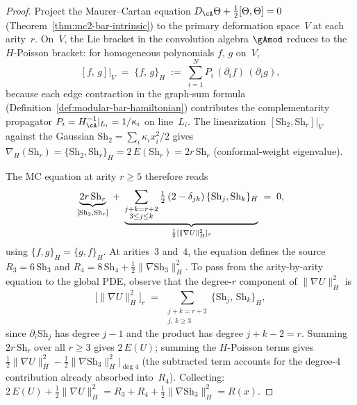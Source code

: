 \begin{proof}
Project the Maurer--Cartan equation
$D_\cA \Theta + \frac{1}{2}[\Theta, \Theta] = 0$
\textup{(}Theorem~\textup{\ref{thm:mc2-bar-intrinsic}})
to the primary deformation space~$V$ at each arity~$r$.
On~$V$, the Lie bracket in the convolution algebra
$\gAmod$ reduces to the $H$-Poisson bracket: for
homogeneous polynomials $f$, $g$ on~$V$,
\begin{equation}\label{eq:h-poisson-bracket}
  [f,\, g]\big|_V
  \;=\;
  \{f,\, g\}_H
  \;:=\;
  \sum_{i=1}^N P_i\,
  (\partial_i f)\,(\partial_i g),
\end{equation}
because each edge contraction in the graph-sum formula
\textup{(}Definition~\textup{\ref{def:modular-bar-hamiltonian}})
contributes the complementarity propagator
$P_i = H_\cA^{-1}|_{L_i} = 1/\kappa_i$ on line~$L_i$.
The linearization $[\mathrm{Sh}_2, \mathrm{Sh}_r]|_V$
against the Gaussian $\mathrm{Sh}_2
= \sum_i \kappa_i x_i^2 / 2$
gives $\nabla_H(\mathrm{Sh}_r)
= \{\mathrm{Sh}_2, \mathrm{Sh}_r\}_H
= 2\,E(\mathrm{Sh}_r) = 2r\,\mathrm{Sh}_r$
\textup{(}conformal-weight eigenvalue\textup{)}.

The MC equation at arity $r \geq 5$ therefore reads
\[
  \underbrace{2r\,\mathrm{Sh}_r}_{[\mathrm{Sh}_2, \mathrm{Sh}_r]}
  \;+\;
  \underbrace{%
  \sum_{\substack{j+k = r+2 \\ 3 \leq j \leq k}}
  \tfrac{1}{2}\,(2 - \delta_{jk})\,
  \{\mathrm{Sh}_j, \mathrm{Sh}_k\}_H%
  }_{%
  \frac{1}{2}[\|\nabla U\|_H^2]_r}
  \;=\; 0,
\]
using $\{f, g\}_H = \{g, f\}_H$.
At arities~$3$ and~$4$, the equation defines
the source $R_3 = 6\,\mathrm{Sh}_3$ and
$R_4 = 8\,\mathrm{Sh}_4
+ \frac{1}{2}\|\nabla \mathrm{Sh}_3\|_H^2$.
To pass from the arity-by-arity equation to the
global PDE, observe that the degree-$r$ component of
$\|\nabla U\|_H^2$ is
\[
  \bigl[\|\nabla U\|_H^2\bigr]_r
  \;=\;
  \sum_{\substack{j + k = r + 2 \\ j,\,k \geq 3}}
  \{\mathrm{Sh}_j,\, \mathrm{Sh}_k\}_H,
\]
since $\partial_i \mathrm{Sh}_j$ has degree $j - 1$
and the product has degree $j + k - 2 = r$.
Summing $2r\,\mathrm{Sh}_r$ over all $r \geq 3$ gives
$2\,E(U)$; summing the $H$-Poisson
terms gives
$\frac{1}{2}\|\nabla U\|_H^2 -
\frac{1}{2}\|\nabla \mathrm{Sh}_3\|_H^2|_{\deg 4}$
\textup{(}the subtracted term accounts for the
degree-$4$ contribution already absorbed into~$R_4$\textup{)}.
Collecting:
$2\,E(U) + \frac{1}{2}\|\nabla U\|_H^2
= R_3 + R_4 + \frac{1}{2}\|\nabla \mathrm{Sh}_3\|_H^2
= R(x)$.
\end{proof}

